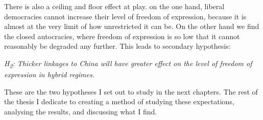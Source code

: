 There is also a ceiling and floor effect at play. on the one hand, liberal democracies cannot increase their level of freedom of expression, because it is almost at the very limit of how unrestricted it can be. On the other hand we find the closed autocracies, where freedom of expression is so low that it cannot reasonably be degraded any further. This leads to secondary hypothesis:
\begin{displayquote}
    \textit{H\textsubscript{2}: Thicker linkages to China will have greater effect on the level of freedom of expression in hybrid regimes.}
\end{displayquote}

These are the two hypotheses I set out to study in the next chapters. The rest of the thesis I dedicate to creating a method of studying these expectations, analysing the results, and discussing what I find. 